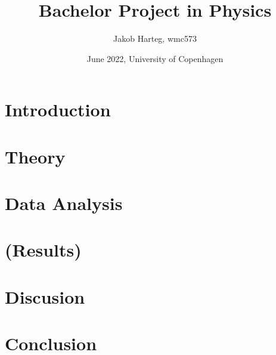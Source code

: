 \documentclass{article}
\title{Bachelor Project in Physics}
\author{Jakob Harteg, wmc573}
\date{June 2022, University of Copenhagen}
\begin{document}
\maketitle


\newpage


\section{Introduction}
 

\section{Theory}
 

\section{Data Analysis}
 

\section{(Results)}
%  

\section{Discusion}
%  

\section{Conclusion}
%  

\newpage
\nocite{*}



\newpage
\appendix
 
\end{document}
